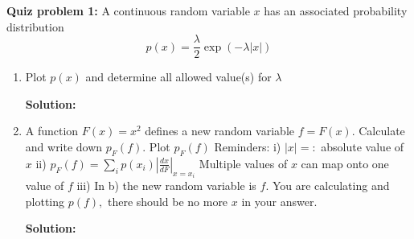 \documentclass[10pt]{article}
\newenvironment{Solution}
    {\textbf{Solution:}
    
    \vspace{5mm}
    \begin{tcolorbox}
    }
    {
    \end{tcolorbox}
    \vspace{5mm}
    }
\begin{document}
\noindent\textbf{Quiz problem 1:} A continuous random variable $x$ has an associated probability distribution
\[
p(x)=\frac{\lambda}{2} \exp (-\lambda|x|)
\]

\begin{enumerate}

    \item Plot $p(x)$ and determine all allowed value(s) for $\lambda$


\begin{Solution}
\end{Solution}

    \item A function $F(x)=x^{2}$ defines a new random variable $f=F(x)$. Calculate and write down $p_{F}(f) .$ Plot $p_{F}(f)$
Reminders:
i) $|x|=:$ absolute value of $x$
ii) $p_{F}(f)=\sum_{i} p\left(x_{i}\right)\left|\frac{d x}{d F}\right|_{x=x_{i}}$ Multiple values of $x$ can map onto one value of $f$
iii) In b) the new random variable is $f .$ You are calculating and plotting $p(f),$ there should be no more $x$ in your answer.

\begin{Solution}
\end{Solution}
\end{enumerate}
\end{document}
